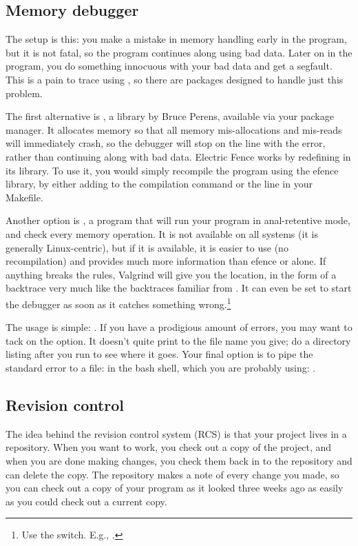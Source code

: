\subsection{Memory debugger}  

The setup is this: you make a mistake in memory handling early in the
program, but it is not fatal, so the program continues along using bad
data. Later on in the program, you do something innocuous with your bad
data and get a segfault. This is a pain to trace using , so
there are packages designed to handle just this problem.

The first alternative is , a library by Bruce Perens,
available via your package manager. It allocates memory so that all memory
mis-allocations and mis-reads will immediately crash, so
the debugger will stop on the line with the error, rather than continuing
along with bad data. Electric Fence works by redefining 
in its library. To use it, you would simply recompile the program using
the efence library, by either adding  to the compilation command
or the  line in your Makefile.


Another option is , a program that will
run your program in anal-retentive mode, and check every memory operation. 
It is not available on all systems (it is generally Linux-centric), but
if it is available, it is easier to use (no recompilation) and provides much more information than efence or
 alone. If anything breaks the rules, Valgrind will give you
the location, in the form of a backtrace very much like the backtraces
familiar from . It can even be set to start the debugger as soon
as it catches something wrong.\footnote{Use the  switch.
E.g., .}

The usage is simple: . If you have a prodigious amount
of errors, you may want to tack on the  option. It doesn't
quite print to the file name you give; do a directory listing after you run  to see where it goes.  Your final option is to pipe the standard
error to a file: in the bash shell, which you are probably using: .

\subsection{Revision control}  \label{valgrind}
The idea behind the revision control system (RCS) is that your project
lives in a repository. When you want to work, you check out
a copy of the project, and when you are done making changes, you check
them back in to the repository and can delete the copy.  The repository
makes a note of every change you made, so you can check out a copy of
your program as it looked three weeks ago as easily as you could check
out a current copy.

